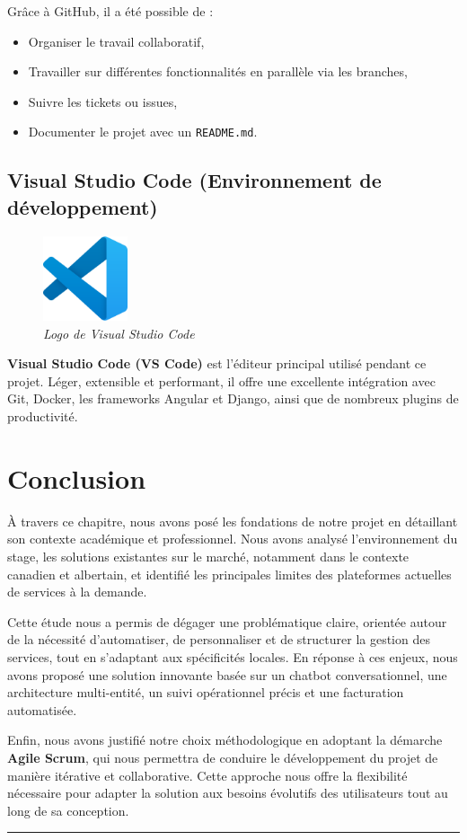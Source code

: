 Grâce à GitHub, il a été possible de :
\begin{itemize}
  \item Organiser le travail collaboratif,
  \item Travailler sur différentes fonctionnalités en parallèle via les branches,
  \item Suivre les tickets ou issues,
  \item Documenter le projet avec un \texttt{README.md}.
\end{itemize}

\subsection*{Visual Studio Code (Environnement de développement)}
\begin{figure}[H]
\centering
\includegraphics[width=2.5cm]{figures/vscode.png}
\caption*{\textit{Logo de Visual Studio Code}}
\end{figure}
\noindent
\textbf{Visual Studio Code (VS Code)} est l’éditeur principal utilisé pendant ce projet. Léger, extensible et performant, il offre une excellente intégration avec Git, Docker, les frameworks Angular et Django, ainsi que de nombreux plugins de productivité.


\section*{Conclusion}

À travers ce chapitre, nous avons posé les fondations de notre projet en détaillant son contexte académique et professionnel. Nous avons analysé l’environnement du stage, les solutions existantes sur le marché, notamment dans le contexte canadien et albertain, et identifié les principales limites des plateformes actuelles de services à la demande.

Cette étude nous a permis de dégager une problématique claire, orientée autour de la nécessité d’automatiser, de personnaliser et de structurer la gestion des services, tout en s’adaptant aux spécificités locales. En réponse à ces enjeux, nous avons proposé une solution innovante basée sur un chatbot conversationnel, une architecture multi-entité, un suivi opérationnel précis et une facturation automatisée.

Enfin, nous avons justifié notre choix méthodologique en adoptant la démarche \textbf{Agile Scrum}, qui nous permettra de conduire le développement du projet de manière itérative et collaborative. Cette approche nous offre la flexibilité nécessaire pour adapter la solution aux besoins évolutifs des utilisateurs tout au long de sa conception.


\rule[1em]{32em}{0.5pt}
